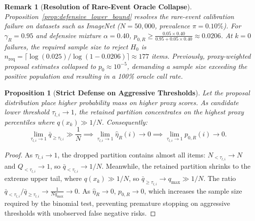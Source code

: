 \documentclass[11pt,a4paper]{article}
\newtheorem{proposition}[theorem]{Proposition}
\newtheorem{remark}{Remark}
\begin{document}
\begin{remark}[\textbf{Resolution of Rare-Event Oracle Collapse}]\label{rem:imagenet_resolution}
Proposition~\ref{prop:defensive_lower_bound} resolves the rare-event calibration failure on datasets such as ImageNet ($N = 50,000$, prevalence $\pi = 0.10\%$). For $\gamma_R = 0.95$ and defensive mixture $\alpha = 0.40$, $p_{0, R} \ge \frac{0.05 \times 0.40}{0.95 + 0.05 \times 0.40} \approx 0.0206$. At $k=0$ failures, the required sample size to reject $H_0$ is $n_{\text{req}} = \lceil \log(0.025) / \log(1 - 0.0206) \rceil \approx 177$ items.
Previously, proxy-weighted proposal estimates collapsed to $p_0 \approx 10^{-5}$, demanding a sample size exceeding the positive population and resulting in a 100\% oracle call rate.
\end{remark}

\begin{proposition}[\textbf{Strict Defense on Aggressive Thresholds}]\label{prop:aggressive_defense}
Let the proposal distribution place higher probability mass on higher proxy scores. As candidate lower threshold $\tau_{l, i} \to 1$, the retained partition concentrates on the highest proxy percentiles where $q(x_k) \gg 1/N$. Consequently:
\begin{equation}
\lim_{\tau_{l, i} \to 1} \bar{q}_{\ge \tau_{l, i}} \gg \frac{1}{N} \implies \lim_{\tau_{l, i} \to 1} \hat{\eta}_R(i) \to 0 \implies \lim_{\tau_{l, i} \to 1} p_{0, R}(i) \to 0.
\end{equation}
\end{proposition}

\begin{proof}
As $\tau_{l, i} \to 1$, the dropped partition contains almost all items: $N_{< \tau_{l, i}} \to N$ and $Q_{< \tau_{l, i}} \to 1$, so $\bar{q}_{< \tau_{l, i}} \to 1/N$.
Meanwhile, the retained partition shrinks to the extreme upper tail, where $q(x_k) \gg 1/N$, so $\bar{q}_{\ge \tau_{l, i}} \to q_{\max} \gg 1/N$.
The ratio $\bar{q}_{< \tau_{l, i}} / \bar{q}_{\ge \tau_{l, i}} \to \frac{1}{N q_{\max}} \to 0$.
As $\hat{\eta}_R \to 0$, $p_{0, R} \to 0$, which increases the sample size required by the binomial test, preventing premature stopping on aggressive thresholds with unobserved false negative risks.
\end{proof}
\end{document}

